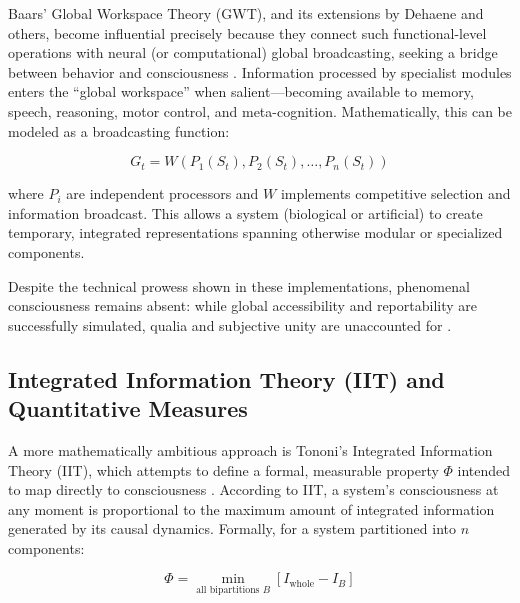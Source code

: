 Baars' Global Workspace Theory (GWT), and its extensions by Dehaene and others, become influential precisely because they connect such functional-level operations with neural (or computational) global broadcasting, seeking a bridge between behavior and consciousness \cite{baars2001conscious,dehaene2021consciousness}. Information processed by specialist modules enters the ``global workspace'' when salient---becoming available to memory, speech, reasoning, motor control, and meta-cognition. Mathematically, this can be modeled as a broadcasting function:

\vspace{-2.0\baselineskip}
\begin{equation}
G_t = W(P_1(S_t), P_2(S_t), \ldots, P_n(S_t))
\label{eq:workspace}
\end{equation}
\vspace{-2.0\baselineskip}

where $P_i$ are independent processors and $W$ implements competitive selection and information broadcast. This allows a system (biological or artificial) to create temporary, integrated representations spanning otherwise modular or specialized components.

Despite the technical prowess shown in these implementations, phenomenal consciousness remains absent: while global accessibility and reportability are successfully simulated, qualia and subjective unity are unaccounted for \cite{chalmers1995facing,garridomerchan2024machine}.

\subsection{Integrated Information Theory (IIT) and Quantitative Measures}
\label{subsec:iit_quantitative}

A more mathematically ambitious approach is Tononi's Integrated Information Theory (IIT), which attempts to define a formal, measurable property $\Phi$ intended to map directly to consciousness \cite{tononi2016integrated,albantakis2023integrated}. According to IIT, a system's consciousness at any moment is proportional to the maximum amount of integrated information generated by its causal dynamics. Formally, for a system partitioned into $n$ components:

\vspace{-2.0\baselineskip}
\begin{equation}
\Phi = \min_{\text{all bipartitions } B} \left[ I_{\text{whole}} - I_{B} \right]
\label{eq:iit_phi}
\end{equation}
\vspace{-1.5\baselineskip}

